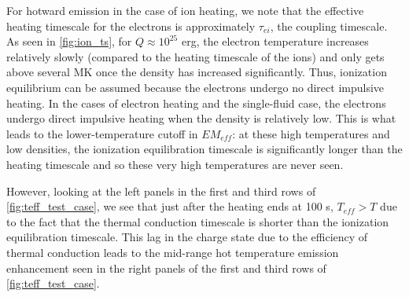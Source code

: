 \documentclass[apj]{emulateapj}
\begin{document}
	\par For hotward emission in the case of ion heating, we note that the effective heating timescale for the electrons is approximately $\tau_{ei}$, the coupling timescale. As seen in \autoref{fig:ion_ts}, for $Q\approx10^{25}$ erg, the electron temperature increases relatively slowly (compared to the heating timescale of the ions) and only gets above several MK once the density has increased significantly. Thus, ionization equilibrium can be assumed because the electrons undergo no direct impulsive heating. In the cases of electron heating and the single-fluid case, the electrons undergo direct impulsive heating when the density is relatively low. This is what leads to the lower-temperature cutoff in $EM_{eff}$: at these high temperatures and low densities, the ionization equilibration timescale is significantly longer than the heating timescale and so these very high temperatures are never seen. 
	\par However, looking at the left panels in the first and third rows of \autoref{fig:teff_test_case}, we see that just after the heating ends at 100 s, $T_{eff}>T$ due to the fact that the thermal conduction timescale is shorter than the ionization equilibration timescale. This lag in the charge state due to the efficiency of thermal conduction leads to the mid-range hot temperature emission enhancement seen in the right panels of the first and third rows of \autoref{fig:teff_test_case}. 
\end{document}

